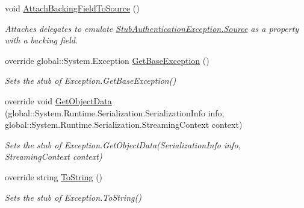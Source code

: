 \begin{DoxyCompactItemize}
void \hyperlink{class_system_1_1_security_1_1_authentication_1_1_fakes_1_1_stub_authentication_exception_ac7088e11e788769517fa246edc779a41}{Attach\-Backing\-Field\-To\-Source} ()
\begin{DoxyCompactList}\small\item\em Attaches delegates to emulate \hyperlink{class_system_1_1_security_1_1_authentication_1_1_fakes_1_1_stub_authentication_exception_afc4a0cc338458bccae5b04e3b662dd42}{Stub\-Authentication\-Exception.\-Source} as a property with a backing field.\end{DoxyCompactList}\item 
override global\-::\-System.\-Exception \hyperlink{class_system_1_1_security_1_1_authentication_1_1_fakes_1_1_stub_authentication_exception_a83c312cbdf9be5e7c88ce26d5472cde2}{Get\-Base\-Exception} ()
\begin{DoxyCompactList}\small\item\em Sets the stub of Exception.\-Get\-Base\-Exception()\end{DoxyCompactList}\item 
override void \hyperlink{class_system_1_1_security_1_1_authentication_1_1_fakes_1_1_stub_authentication_exception_a8a5fb48bc64b172b93bb1dd882262ed9}{Get\-Object\-Data} (global\-::\-System.\-Runtime.\-Serialization.\-Serialization\-Info info, global\-::\-System.\-Runtime.\-Serialization.\-Streaming\-Context context)
\begin{DoxyCompactList}\small\item\em Sets the stub of Exception.\-Get\-Object\-Data(\-Serialization\-Info info, Streaming\-Context context)\end{DoxyCompactList}\item 
override string \hyperlink{class_system_1_1_security_1_1_authentication_1_1_fakes_1_1_stub_authentication_exception_a795822b55f5caec46c1a3729eef48be0}{To\-String} ()
\begin{DoxyCompactList}\small\item\em Sets the stub of Exception.\-To\-String()\end{DoxyCompactList}\end{DoxyCompactItemize}
